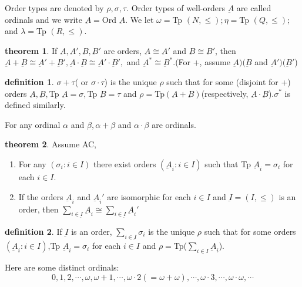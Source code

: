 \documentclass[a4paper,11pt]{article}%
\theoremstyle{remark}
\theoremstyle{definition}
\newtheorem{theorem}{theorem}[section]
\theoremstyle{definition}
\newtheorem*{definition}{definition}
\theoremstyle{plain}
\theoremstyle{definition}
\begin{document}
Order types are denoted by $\rho,\sigma,\tau.$ Order types of well-orders $\underbar{A}$
are called ordinals and we write $\underbar{A}=$Ord $\underbar{A}$. We let $\omega=$Tp $(N,\leq);\eta=$Tp $(Q,\leq);$
and $\lambda=$Tp $(R,\leq)$.
\begin{theorem}
    If $\underbar{A},\underbar{A}',\underbar{B},\underbar{B}'$ are orders, $\underbar{A}\cong\underbar{A}'$
    and $\underbar{B}\cong\underbar{B}'$, then $\underbar{A}+\underbar{B}\cong\underbar{A}'+\underbar{B}',\underbar{A}\cdot\underbar{B}\cong\underbar{A}'\cdot\underbar{B}',$
    and $\underbar{A}^*\cong\underbar{B}^*.$(For +, assume $\underbar{A})(\underbar{B}$ and $\underbar{A}')(\underbar{B}'$)
\end{theorem}
\begin{definition}
    $\sigma+\tau$( or $\sigma\cdot\tau$) is the unique $\rho$ such that for some
    (disjoint for +) orders $\underbar{A},\underbar{B},$Tp $\underbar{A}=\sigma,$Tp $\underbar{B}=\tau$ and 
    $\rho=$Tp$(\underbar{A}+\underbar{B})$(respectively, $\underbar{A}\cdot\underbar{B}$).$\sigma^*$ is defined similarly.
\end{definition}
For any ordinal $\alpha$ and $\beta,\alpha+\beta$ and $\alpha\cdot\beta$ are ordinals.
\begin{theorem}
    Assume AC,
    \begin{enumerate}
        \item For any $(\sigma_i:i\in I)$ there exist orders $(\underbar{A}_i:i\in I)$ such that 
        Tp $\underbar{A}_i=\sigma_i$ for each $i\in I$.
        \item If the orders $\underbar{A}_i$ and $\underbar{A}_i'$ are isomorphic for 
        each $i\in I$ and $\underbar{I}=(I,\leq)$ is an order, then $\sum_{i\in \underbar{I}}\underbar{A}_i\cong\sum_{i\in \underbar{I}}\underbar{A}_i'$
    \end{enumerate}
\end{theorem}
\begin{definition}
    If $\underbar{I}$ is an order, $\sum_{i\in \underbar{I}}\sigma_i$ is the unique $\rho$
    such that for some orders $(\underbar{A}_i:i\in I)$,Tp $\underbar{A}_i=\sigma_i$ for each $i\in I$
    and $\rho=$Tp($\sum_{i\in I}\underbar{A}_i$).
\end{definition}
Here are some distinct ordinals:
\[0,1,2,\cdots,\omega,\omega+1,\cdots,\omega\cdot 2(=\omega+\omega),\cdots,\omega\cdot 3,\cdots,\omega\cdot\omega,\cdots\]
\end{document}
